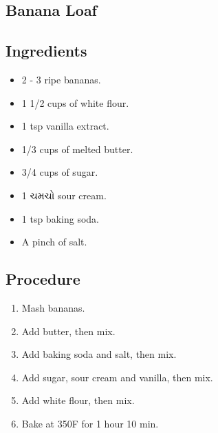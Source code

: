 \documentclass[../../recipes.tex]{subfiles}
\begin{document}
\begin{gujarati}

\chapter{Banana Loaf}

\section*{Ingredients}

\begin{itemize}
    \item 2 - 3 ripe bananas.
    \item 1 1/2 cups of white flour.
    \item 1 tsp vanilla extract.
    \item 1/3 cups of melted butter.
    \item 3/4 cups of sugar.
    \item 1 ચમચો sour cream.
    \item 1 tsp baking soda.
    \item A pinch of salt.
\end{itemize}

\noindent
\section*{Procedure}

\begin{enumerate}
    \item Mash bananas.
    \item Add butter, then mix.
    \item Add baking soda and salt, then mix.
    \item Add sugar, sour cream and vanilla, then mix.
    \item Add white flour, then mix.
    \item Bake at 350\textdegree F for 1 hour 10 min.
\end{enumerate}

\end{gujarati}
\end{document}
